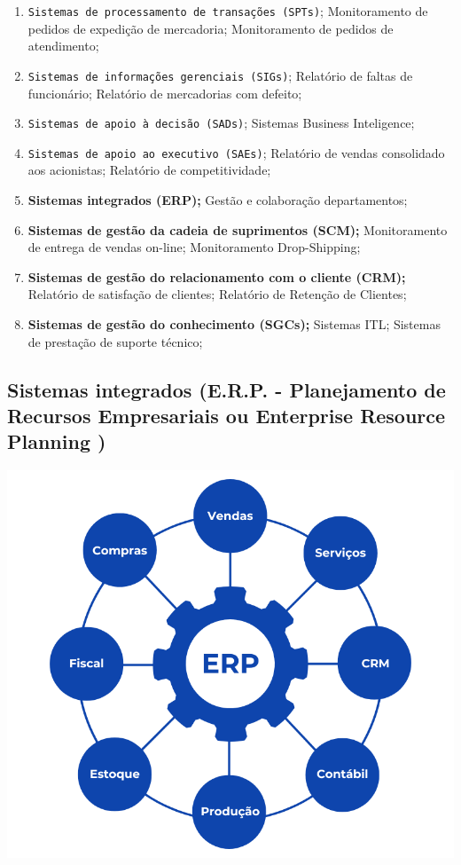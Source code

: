 \documentclass[
]{book}
\begin{document}
\begin{enumerate}
\def\labelenumi{\arabic{enumi}.}
\item
  \texttt{Sistemas\ de\ processamento\ de\ transações\ (SPTs)}; Monitoramento de pedidos de expedição de mercadoria; Monitoramento de pedidos de atendimento;
\item
  \texttt{Sistemas\ de\ informações\ gerenciais\ (SIGs)}; Relatório de faltas de funcionário; Relatório de mercadorias com defeito;
\item
  \texttt{Sistemas\ de\ apoio\ à\ decisão\ (SADs)}; Sistemas Business Inteligence;
\item
  \texttt{Sistemas\ de\ apoio\ ao\ executivo\ (SAEs)}; Relatório de vendas consolidado aos acionistas; Relatório de competitividade;
\item
  \textbf{Sistemas integrados (ERP);} Gestão e colaboração departamentos;
\item
  \textbf{Sistemas de gestão da cadeia de suprimentos (SCM);} Monitoramento de entrega de vendas on-line; Monitoramento Drop-Shipping;
\item
  \textbf{Sistemas de gestão do relacionamento com o cliente (CRM);} Relatório de satisfação de clientes; Relatório de Retenção de Clientes;
\item
  \textbf{Sistemas de gestão do conhecimento (SGCs);} Sistemas ITL; Sistemas de prestação de suporte técnico;
\end{enumerate}

\subsection{Sistemas integrados (E.R.P. - Planejamento de Recursos Empresariais ou Enterprise Resource Planning )}\label{sistemas-integrados-e.r.p.---planejamento-de-recursos-empresariais-ou-enterprise-resource-planning}

\includegraphics[width=6.28125in,height=\textheight]{images/sistemas/erp.png}
\end{document}
